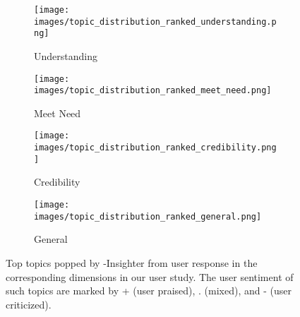 \begin{figure*}[ht]
  \centering
  \vspace{-0.3cm}
  \begin{subfigure}[]{0.24\textwidth}
    \texttt{[image: images/topic\_distribution\_ranked\_understanding.png]}
    \caption{{Understanding}}
  \end{subfigure}
  \hfill
  \begin{subfigure}[]{0.24\textwidth}
    \texttt{[image: images/topic\_distribution\_ranked\_meet\_need.png]}
    \caption{Meet Need}
  \end{subfigure}
      \hfill
  \begin{subfigure}[]{0.24\textwidth}
    \texttt{[image: images/topic\_distribution\_ranked\_credibility.png]}
    \caption{Credibility}
  \end{subfigure}
  \begin{subfigure}[]{0.24\textwidth}
    \texttt{[image: images/topic\_distribution\_ranked\_general.png]}
    \caption{General}
  \end{subfigure}
  \vspace{-0.3cm}
    \caption{Top topics popped by \method-Insighter from user response in the corresponding dimensions in our user study. The user sentiment of such topics are marked by + (user praised), . (mixed), and - (user criticized).\label{fig:interview_topics}}
\end{figure*}